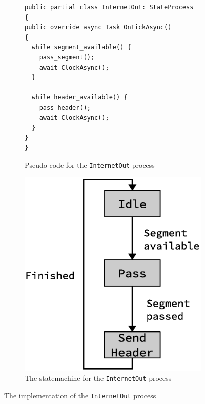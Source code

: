 \begin{figure}[htpb]
    \centering
    \begin{subfigure}[b]{0.5\textwidth}
        \centering
\begin{lstlisting}[language={[Sharp]C}]
public partial class InternetOut: StateProcess
{
public override async Task OnTickAsync()
{
  while segment_available() {
    pass_segment();
    await ClockAsync();
  }

  while header_available() {
    pass_header();
    await ClockAsync();
  }
}
}
\end{lstlisting}
        \caption{Pseudo-code for the \texttt{InternetOut} process}
	\label{fig:internet_out_pseudocode}
    \end{subfigure}%
    \begin{subfigure}[b]{0.50\textwidth}
        \centering
        \includegraphics[scale=0.45]{implementation/internet_out_fsm.eps}
        \caption{The statemachine for the \texttt{InternetOut} process}
 	\label{fig:internet_out_fsm}
    \end{subfigure}%
    \caption{The implementation of the \texttt{InternetOut} process}
    \label{fig:internet_out_implementation}
\end{figure}


